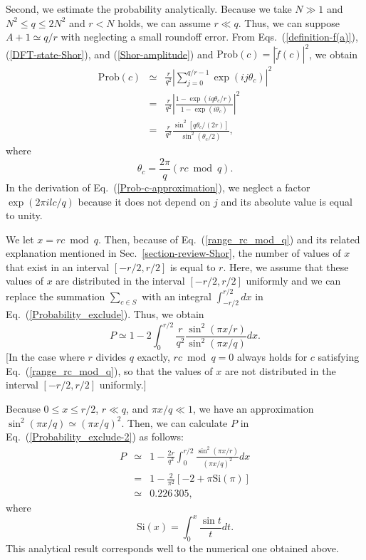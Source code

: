 \documentclass[12pt]{article}
\begin{document}
Second,
we estimate the probability analytically.
Because we take $N\gg 1$ and $N^{2}\leq q\leq 2N^{2}$ and $r<N$ holds,
we can assume $r\ll q$.
Thus,
we can suppose $A+1\simeq q/r$ with neglecting a small roundoff error.
From Eqs.~(\ref{definition-f(a)}), (\ref{DFT-state-Shor}), and (\ref{Shor-amplitude})
and $\mbox{Prob}(c)=|\tilde{f}(c)|^{2}$,
we obtain
\begin{eqnarray}
\mbox{Prob}(c)
&\simeq&
\frac{r}{q^{2}}
|
\sum_{j=0}^{q/r-1}
\exp(ij\theta_{c})
|^{2} \nonumber \\
&=&
\frac{r}{q^{2}}
\left|
\frac{1-\exp(iq\theta_{c}/r)}{1-\exp(i\theta_{c})}
\right|^{2} \nonumber \\
&=&
\frac{r}{q^{2}}
\frac{\sin^{2}[q\theta_{c}/(2r)]}{\sin^{2}(\theta_{c}/2)},
\label{Prob-c-approximation}
\end{eqnarray}
where
\begin{equation}
\theta_{c}
=
\frac{2\pi}{q}(rc \bmod q).
\end{equation}
In the derivation of Eq.~(\ref{Prob-c-approximation}),
we neglect a factor $\exp(2\pi ilc/q)$
because it does not depend on $j$ and its absolute value is equal to unity.

We let $x=rc \bmod q$.
Then,
because of Eq.~(\ref{range_rc_mod_q}) and its related explanation mentioned in Sec.~\ref{section-review-Shor},
the number of values of $x$ that exist in an interval $[-r/2,r/2]$ is equal to $r$.
Here,
we assume that these values of $x$ are distributed in the interval $[-r/2,r/2]$ uniformly
and we can replace the summation $\sum_{c\in S}$ with an integral $\int_{-r/2}^{r/2}dx$
in Eq.~(\ref{Probability_exclude}).
Thus, we obtain
\begin{equation}
P
\simeq
1
-
2
\int_{0}^{r/2}
\frac{r}{q^{2}}
\frac{\sin^{2}(\pi x/r)}{\sin^{2}(\pi x/q)}dx.
\label{Probability_exclude-2}
\end{equation}
[In the case where $r$ divides $q$ exactly,
$rc \bmod q=0$ always holds for $c$ satisfying Eq.~(\ref{range_rc_mod_q}),
so that the values of $x$ are not distributed in the interval $[-r/2,r/2]$ uniformly.]

Because $0\leq x\leq r/2$, $r\ll q$, and $\pi x/q\ll 1$,
we have an approximation
$\sin^{2}(\pi x/q)\simeq (\pi x/q)^{2}$.
Then,
we can calculate $P$ in Eq.~(\ref{Probability_exclude-2}) as follows:
\begin{eqnarray}
P
&\simeq&
1
-
\frac{2r}{q^{2}}
\int_{0}^{r/2}
\frac{\sin^{2}(\pi x/r)}{(\pi x/q)^{2}}dx \nonumber \\
&=&
1
-
\frac{2}{\pi^{2}}
[-2+\pi \mbox{Si}(\pi)] \nonumber \\
&\simeq&
0.226{\,}305,
\end{eqnarray}
where
\begin{equation}
\mbox{Si}(x)
=
\int_{0}^{x}
\frac{\sin t}{t}dt.
\end{equation}
This analytical result corresponds well to the numerical one obtained above.
\end{document}
